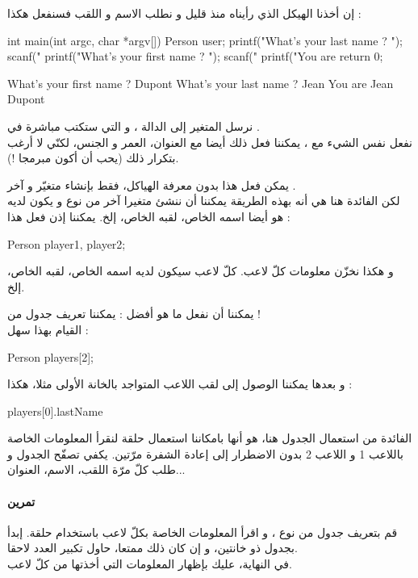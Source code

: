 إن أخذنا الهيكل
الذي رأيناه منذ قليل و نطلب الاسم و اللقب فسنفعل هكذا :
\begin{Csource}
int main(int argc, char *argv[])
{
	Person user;
  printf("What's your last name ? ");
	scanf("%
	printf("What's your first name ? ");
	scanf("%
	printf("You are %
	return 0;
}
\end{Csource}
\begin{Console}
What's your first name ? Dupont
What's your last name ? Jean
You are Jean Dupont
\end{Console}
نرسل المتغير
إلى الدالة
،
و التي ستكتب مباشرة في
.\\
نفعل نفس الشيء مع
،
يمكننا فعل ذلك أيضا مع العنوان، العمر و الجنس، لكنّي لا أرغب بتكرار ذلك (يحب أن أكون مبرمجا !).

يمكن فعل هذا بدون معرفة الهياكل، فقط بإنشاء متغيّر
و آخر
.\\
لكن الفائدة هنا هي أنه بهذه الطريقة يمكننا أن ننشئ متغيرا آخر من نوع
و يكون لديه هو أيضا اسمه الخاص، لقبه الخاص، إلخ. يمكننا إذن فعل هذا :
\begin{Csource}
Person player1, player2;
\end{Csource}
و هكذا نخزّن معلومات كلّ لاعب. كلّ لاعب سيكون لديه اسمه الخاص، لقبه الخاص، إلخ.

يمكننا أن نفعل ما هو أفضل : يمكننا تعريف جدول من
 !\\
القيام بهذا سهل :
\begin{Csource}
Person players[2];
\end{Csource}
و بعدها يمكننا الوصول إلى لقب اللاعب المتواجد بالخانة الأولى مثلا، هكذا :
\begin{Console}
players[0].lastName
\end{Console}
الفائدة من استعمال الجدول هنا، هو أنها بامكاننا استعمال حلقة لنقرأ المعلومات الخاصة باللاعب 1 و اللاعب 2 بدون الاضطرار إلى إعادة الشفرة مرّتين. يكفي تصفّح الجدول
و طلب كلّ مرّة اللقب، الاسم، العنوان...

\paragraph{تمرين}
قم بتعريف جدول من نوع
،
و اقرأ المعلومات الخاصة بكلّ لاعب باستخدام حلقة. إبدأ بجدول ذو خانتين، و إن كان ذلك ممتعا، حاول تكبير العدد لاحقا.\\
في النهاية، عليك بإظهار المعلومات التي أخذتها من كلّ لاعب.


